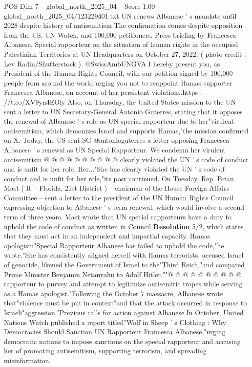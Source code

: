 \begin{textsample}{POS Dim 7 – global\_north\_2025\_04 – Score 1.00 – global\_north\_2025\_04/123229401.txt}  \label{ex:f7_pos_358}
UN renews Albanese ' s mandate until 2028 despite history of antisemitism The confirmation comes despite opposition from the US, UN Watch, and 100,000 petitioners.
Press briefing by Francesca Albanese, Special rapporteur on the situation of human rights in the occupied Palestinian Territories at UN Headquarters on October 27, 2022. ( photo credit : Lev Radin/Shutterstock ). @SwissAmbUNGVA I hereby present you, as President of the Human Rights Council, with our petition signed by 100,000 people from around the world urging you not to reappoint Hamas supporter Francesca Albanese, on account of her persistent violations.https : //t.co/XV9yn4EOly Also, on Thursday, the United States mission to the UN sent a letter to UN Secretary-General Antonio Guterres, stating that it opposes the renewal of Albanese ' s role as UN special rapporteur due to her"virulent antisemitism, which demonizes Israel and supports Hamas,"the mission confirmed on X.
Today, the US sent SG @antonioguterres a letter opposing Francesca Albanese ' s renewal as UN Special Rapporteur.
We condemn her virulent antisemitism @ @ @ @ @ @ @ @ @ @ clearly violated the UN ' s code of conduct and is unfit for her role.
Her..."She has clearly violated the UN ' s code of conduct and is unfit for her role,"its post continued.
On Tuesday, Rep.
Brian Mast ( R -- Florida, 21st District ) -- chairman of the House Foreign Affairs Committee -- sent a letter to the president of the UN Human Rights Council expressing objection to Albanese ' s term renewal, which would involve a second term of three years.
Mast wrote that UN special rapporteurs have a duty to uphold the code of conduct as written in Council \textbf{Resolution} 5/2, which states that they must act in an independent and impartial capacity.
Hamas apologism"Special Rapporteur Albanese has failed to uphold the code,"he wrote."She has consistently aligned herself with Hamas terrorists, accused Israel of genocide, likened the Government of Israel to the"Third Reich,"and compared Prime Minister Benjamin Netanyahu to Adolf Hitler.""@ @ @ @ @ @ @ @ @ @ rapporteur to purvey and attempt to legitimize antisemitic tropes while serving as a Hamas apologist."Following the October 7 massacre, Albanese wrote that"violence must be put in context"and that the attack occurred in response to Israeli"aggression."Previous calls for action against Albanese In October, United Nations Watch published a report titled"Wolf in Sheep ' s Clothing : Why Democracies Should Sanction UN Rapporteur Francesca Albanese,"urging democratic nations to impose sanctions on the special rapporteur and accusing her of promoting antisemitism, supporting terrorism, and spreading misinformation.

\end{textsample}
